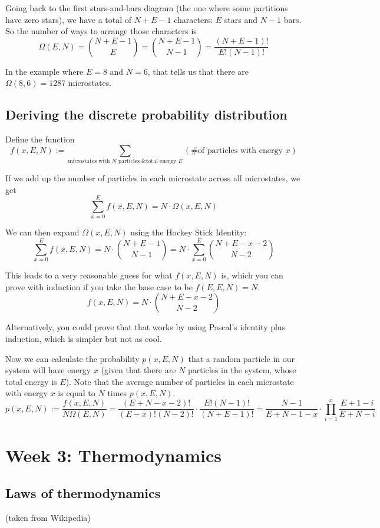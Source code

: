 \documentclass[12pt]{article}
\begin{document}
Going back to the first stars-and-bars diagram (the one where some partitions have zero stars), we have a total of $N+E-1$ characters: $E$ stars and $N-1$ bars. So the number of ways to arrange those characters is
\[\Omega(E, N) = {{N+E-1} \choose E} = {{N+E-1} \choose {N-1}} = \frac{(N+E-1)!}{E!(N-1)!} \]

In the example where $E=8$ and $N=6$, that tells us that there are $\Omega(8, 6) = 1287$ microstates.

\subsection{Deriving the discrete probability distribution}

Define the function
\[f(x, E, N) := \sum_{\text{microstates with $N$ particles \& total energy $E$}} (\text{\# of particles with energy $x$})\]

If we add up the number of particles in each microstate across all microstates, we get
\[\sum_{x=0}^E f(x, E, N) = N \cdot \Omega(x, E, N)\]

We can then expand $\Omega(x, E, N)$ using the Hockey Stick Identity:
\[\sum_{x=0}^E f(x, E, N) = N \cdot {{N+E-1} \choose {N-1}} = N \cdot \sum_{x=0}^E {{N+E-x-2} \choose {N-2}} \]

This leads to a very reasonable guess for what $f(x, E, N)$ is, which you can prove with induction if you take the base case to be $f(E,E,N) = N$.
\[f(x, E, N) = N \cdot {{N+E-x-2} \choose {N-2}}\]

Alternatively, you could prove that that works by using Pascal's identity plus induction, which is simpler but not as cool.

Now we can calculate the probability $p(x, E, N)$ that a random particle in our system will have energy $x$ (given that there are $N$ particles in the system, whose total energy is $E$). Note that the average number of particles in each microstate with energy $x$ is equal to $N$ times $p(x, E, N)$.
\[p(x, E, N) := \frac{f(x, E, N)}{N \Omega(E, N)} = \frac{(E+N-x-2)!}{(E-x)!(N-2)!} \cdot \frac{E!(N-1)!}{(N+E-1)!} = \frac{N-1}{E+N-1-x} \cdot \prod_{i=1}^x \frac{E+1-i}{E+N-i} \]

\section{Week 3: Thermodynamics}

\subsection{Laws of thermodynamics}
(taken from Wikipedia)
\end{document}

